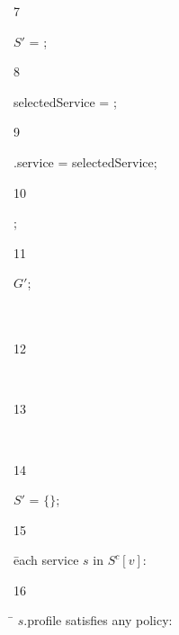 \begin{figure}[!t]
\begin{ourcolor}
\begin{tabbing}
      \begin{redtext}7\end{redtext}\tabone $S'$ = ;\\
      \begin{redtext}8\end{redtext}\tabone selectedService = ;\\
      \begin{redtext}9\end{redtext}\tabone \vii{}.service = selectedService;\\
      \begin{redtext}10\end{redtext};\\
      \begin{redtext}11\end{redtext} $G'$;\\
      \\
      \\
      \begin{redtext}12\end{redtext}\\
      \begin{redtext}13\end{redtext}\\
      \begin{redtext}14\end{redtext}$S'$ = $\{\}$;\\
      \begin{redtext}15\end{redtext} \= each service $s$ in $S^c[v]$:\\
      \begin{redtext}16\end{redtext}\tabone {} \= $s$.profile satisfies any policy:\\

\end{tabbing}
\end{ourcolor}
\end{figure}
